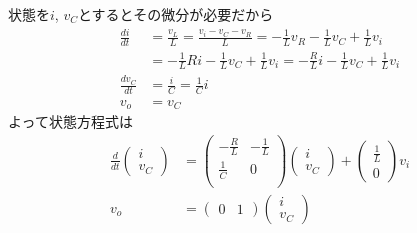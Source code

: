 状態を$i$, $v_C$とするとその微分が必要だから
\begin{align*}
	\frac{d i}{dt} 
	&= \frac{v_L}{L} 
	= \frac{v_i - v_C - v_R}{L} 
	= - \frac{1}{L} v_R - \frac{1}{L} v_C + \frac{1}{L} v_i 
\\ &
	= - \frac{1}{L} R i - \frac{1}{L} v_C + \frac{1}{L} v_i 
	= - \frac{R}{L} i - \frac{1}{L} v_C + \frac{1}{L} v_i \\
	\frac{d v_C}{dt}
	&= \frac{i}{C} 
	= \frac{1}{C} i \\
	v_o &= v_C 
\end{align*}
よって状態方程式は
\begin{align*}
	\frac{d}{dt}
	\left (
	\begin{array}{c}
		i \\
		v_C
	\end{array}
	\right )
	&=
	\left (
	\begin{array}{cc}
		-\frac{R}{L} & -\frac{1}{L} \\
		\frac{1}{C} & 0 \\
	\end{array}
	\right )
	\left (
	\begin{array}{c}
		i \\
		v_C
	\end{array}
	\right )
	+
	\left (
	\begin{array}{c}
		\frac{1}{L} \\
		0
	\end{array}
	\right )
	v_i
\\
	v_o 
	&=
	\left (
	\begin{array}{cc}
		0 & 1 
	\end{array}
	\right )
	\left (
	\begin{array}{c}
		i \\
		v_C
	\end{array}
	\right )
\end{align*}




